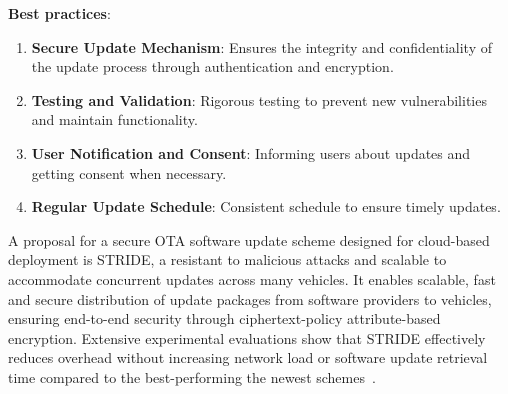 \textbf{Best practices}:
\begin{enumerate}
    \item \textbf{Secure Update Mechanism}: Ensures the integrity and confidentiality of the update process through authentication and encryption.
    \item \textbf{Testing and Validation}: Rigorous testing to prevent new vulnerabilities and maintain functionality.
    \item \textbf{User Notification and Consent}: Informing users about updates and getting consent when necessary.
    \item \textbf{Regular Update Schedule}: Consistent schedule to ensure timely updates.
\end{enumerate}

A proposal for a secure OTA software update scheme designed for cloud-based deployment is STRIDE, a resistant to malicious attacks and scalable to accommodate concurrent updates across many vehicles.
It enables scalable, fast and secure distribution of update packages from software providers to vehicles, ensuring end-to-end security through ciphertext-policy attribute-based encryption.
Extensive experimental evaluations show that STRIDE effectively reduces overhead without increasing network load or software update retrieval time compared to the best-performing the newest schemes~\cite{sota}.
